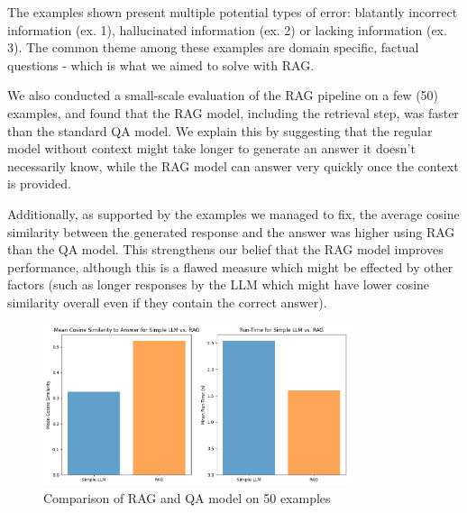 \documentclass[12pt]{article}
\begin{document}
The examples shown present multiple potential types of error: blatantly incorrect information (ex. 1), hallucinated information (ex. 2) or lacking information (ex. 3).
The common theme among these examples are domain specific, factual questions - which is what we aimed to solve with RAG.

We also conducted a small-scale evaluation of the RAG pipeline on a few (50) examples, and found that the RAG model, including the retrieval step, was faster than the standard QA model. 
We explain this by suggesting that the regular model without context might take longer to generate an answer it doesn't necessarily know, while the RAG model can answer very quickly once the context is provided.

Additionally, as supported by the examples we managed to fix, the average cosine similarity between the generated response and the answer was higher using RAG than the QA model.
This strengthens our belief that the RAG model improves performance, although this is a flawed measure which might be effected by other factors (such as longer responses by the LLM which might have lower cosine similarity overall even if they contain the correct answer).


\begin{figure}[H]
    \centering
    \includegraphics[width=0.8\textwidth]{images/3_1.png}
    \caption{Comparison of RAG and QA model on 50 examples}
\end{figure}

\end{document}
